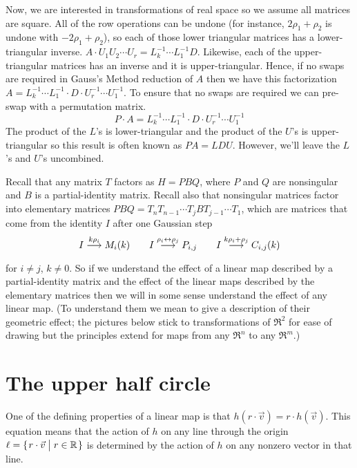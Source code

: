 Now, we are interested in transformations of real space so we assume all
matrices are square.
All of the row operations can be undone (for instance, $2\rho_1+\rho_2$
is undone with $-2\rho_1+\rho_2$), so each of those lower triangular matrices
has a lower-triangular inverse.
$A\cdot U_1U_2\cdots U_r = L_k^{-1}\cdots L_1^{-1}D$. 
Likewise, each of the upper-triangular matrices has an inverse and it is
upper-triangular.
Hence, if no swaps are required in Gauss's Method reduction of $A$ then we have
this factorization 
$A = L_k^{-1}\cdots L_1^{-1}\cdot D\cdot U_r^{-1}\cdots U_1^{-1}$.
To ensure that no swaps are required we can pre-swap with a permutation matrix.
\begin{equation*}
  P\cdot A = L_k^{-1}\cdots L_1^{-1}\cdot D\cdot U_r^{-1}\cdots U_1^{-1}
  \tag{$**$}
\end{equation*}
The product of the $L$'s is lower-triangular and the product of the
$U$'s is upper-triangular so this result is often known as $PA=LDU$.
However, we'll leave the $L$'s and $U$'s uncombined.

Recall that any matrix $T$ factors as $H=PBQ$, 
where $P$ and $Q$ are nonsingular and $B$ is a partial-identity matrix.
Recall also that nonsingular matrices
factor into elementary matrices
$PBQ=T_nT_{n-1}\cdots T_jBT_{j-1}\cdots T_1$,
which are matrices that
come from the identity $I$ after one Gaussian step
\begin{equation*}
  I\mathrel{ \mathop{\longrightarrow}\limits^{k\rho_i\mathstrut}_{ \begin{subarray}{l} \relax \end{subarray}}}M_i(k) 
  \qquad 
  I\mathrel{ \mathop{\longrightarrow}\limits^{\rho_i\leftrightarrow\rho_j\mathstrut}_{ \begin{subarray}{l} \relax \end{subarray}}}P_{i,j}  
  \qquad
  I\mathrel{ \mathop{\longrightarrow}\limits^{k\rho_i+\rho_j\mathstrut}_{ \begin{subarray}{l} \relax \end{subarray}}}C_{i,j}(k) 
\end{equation*}
for $i\neq j$, $k\neq 0$.
So if we understand the effect of a linear map described
by a partial-identity matrix and the effect of the linear maps
described by the elementary matrices then we will in some sense
understand the effect of any linear map.
(To understand them we mean to give a description of their geometric effect;
the pictures below stick to transformations of $\Re^2$ for ease of drawing
but the principles extend for maps from any $\Re^n$ to any $\Re^m$.)







\section{The upper half circle}
One of the defining properties of a linear map is that 
$h(r\cdot\vec{v})=r\cdot h(\vec{v})$.
This equation means that the action of $h$ on any line through the origin
$\ell=\mbox{$\{\hspace{0.1em}r\cdot \vec{v}\bigm| r\in\mathbb{R}\hspace{0.1em}\}$}$ is determined by the action
of $h$ on any nonzero vector in that line.

